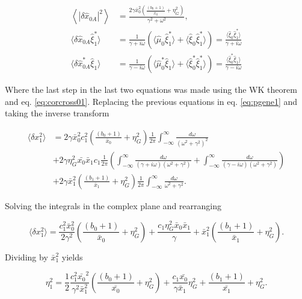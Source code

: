\begin{align*}
\left\langle|\delta \hat{x}_{0A}|^2\right\rangle &= \frac{2\gamma\bar{x}_0^2\left(\frac{(b_0+1)}{\bar{x}_0}+ \eta_G^2\right)}{\gamma^2+\omega^2},\\
\langle\delta \hat{x}_{0A}\hat{\xi}_1^*\rangle &= \frac{1}{\gamma+i\omega}\left(\langle\hat{\mu}_0\hat{\xi}_1^*\rangle + \langle\hat{\xi}_0\hat{\xi}_1^*\rangle \right) = \frac{\langle\hat{\xi}_0\hat{\xi}_1^*\rangle}{\gamma+i\omega}\\
\langle\delta \hat{x}_{0A}^*\hat{\xi}_1\rangle &= \frac{1}{\gamma-i\omega}\left(\langle\hat{\mu}_0^*\hat{\xi}_1\rangle + \langle\hat{\xi}_0^*\hat{\xi}_1^*\rangle \right) = \frac{\langle\hat{\xi}_0^*\hat{\xi}_1\rangle}{\gamma-i\omega}
\end{align*}

Where the last step in the last two equations was made using the WK theorem and eq. \eqref{eq:corcross01}. Replacing the previous equations in eq. \eqref{eq:pgene1} and taking the inverse transform

\begin{equation*}
  \begin{split}
    \langle \delta x_1^2\rangle &= 2\gamma\bar{x}_0^2c_1^2\left(\frac{(b_0+1)}{\bar{x}_0}+ \eta_G^2\right)\frac{1}{2\pi}\int_{-\infty}^{\infty}\frac{d\omega}{(\omega^2+\gamma^2)^2}\\
    &+2\gamma\eta_G^2\bar{x_0}\bar{x}_1c_1\frac{1}{2\pi}\left(\int_{-\infty}^{\infty}\frac{d\omega}{(\gamma + i\omega)(\omega^2+\gamma^2)} + \int_{-\infty}^{\infty}\frac{d\omega}{(\gamma - i\omega)(\omega^2+\gamma^2)}\right)\\
    &+2\gamma\bar{x}_1^2 \left(\frac{(b_1+1)}{\bar{x}_1}+\eta_G^2\right)\frac{1}{2\pi}\int_{-\infty}^{\infty}\frac{d\omega}{\omega^2+\gamma^2}.
  \end{split}
\end{equation*} 

Solving the integrals in the complex plane and rearranging

\begin{equation*}
  \langle \delta x_1^2\rangle = \frac{c_1^2\bar{x}_0^2}{2\gamma^2}\left(\frac{(b_0+1)}{\bar{x}_0}+ \eta_G^2\right) + \frac{c_1\eta_G^2\bar{x}_0\bar{x}_1}{\gamma} + \bar{x}_1^2\left(\frac{(b_1+1)}{\bar{x}_1}+\eta_G^2\right).
\end{equation*}

Dividing by $\bar{x}_1^2$ yields

\begin{equation}
  \label{eq:lan-eta1_alm}
  \eta_1^2 = \frac{1}{2}\frac{c_1^2\bar{x_0}^2}{\gamma^2\bar{x}_1^2}\left(\frac{(b_0+1)}{\bar{x_0}}+ \eta_G^2\right) + \frac{c_1\bar{x_0}}{\gamma \bar{x}_1}\eta_G^2 + \frac{(b_1+1)}{\bar{x_1}}+\eta_G^2.
\end{equation}


